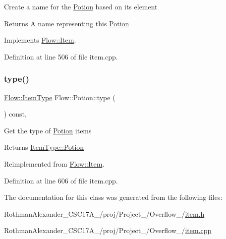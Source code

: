 Create a name for the \hyperlink{class_flow_1_1_potion}{Potion} based on its element \begin{DoxyReturn}{Returns}
A name representing this \hyperlink{class_flow_1_1_potion}{Potion} 
\end{DoxyReturn}


Implements \hyperlink{class_flow_1_1_item_a775605940d8a063e7cf5c7d87820d4d1}{Flow\+::\+Item}.



Definition at line 506 of file item.\+cpp.

\hypertarget{class_flow_1_1_potion_a5594ca2469cc324d4fc163cc96955d42}{}\label{class_flow_1_1_potion_a5594ca2469cc324d4fc163cc96955d42} 
\subsubsection{\texorpdfstring{type()}{type()}}
{\footnotesize\ttfamily \hyperlink{namespace_flow_a09368c0b65b3d1bc5c227ed1046c8bca}{Flow\+::\+Item\+Type} Flow\+::\+Potion\+::type (\begin{DoxyParamCaption}{ }\end{DoxyParamCaption}) const\hspace{0.3cm}{\ttfamily [override]}, {\ttfamily [virtual]}}

Get the type of \hyperlink{class_flow_1_1_potion}{Potion} items \begin{DoxyReturn}{Returns}
\hyperlink{namespace_flow_a09368c0b65b3d1bc5c227ed1046c8bcaaf7f5d540f521d6d642502a9d459e7b16}{Item\+Type\+::\+Potion} 
\end{DoxyReturn}


Reimplemented from \hyperlink{class_flow_1_1_item_ae0c7ea7506ef62f2204837131f021f55}{Flow\+::\+Item}.



Definition at line 606 of file item.\+cpp.



The documentation for this class was generated from the following files\+:\begin{DoxyCompactItemize}
\item 
Rothman\+Alexander\+\_\+\+C\+S\+C17\+A\+\_/proj/\+Project\+\_/\+Overflow\+\_/\hyperlink{item_8h}{item.\+h}\item 
Rothman\+Alexander\+\_\+\+C\+S\+C17\+A\+\_/proj/\+Project\+\_/\+Overflow\+\_/\hyperlink{item_8cpp}{item.\+cpp}\end{DoxyCompactItemize}
